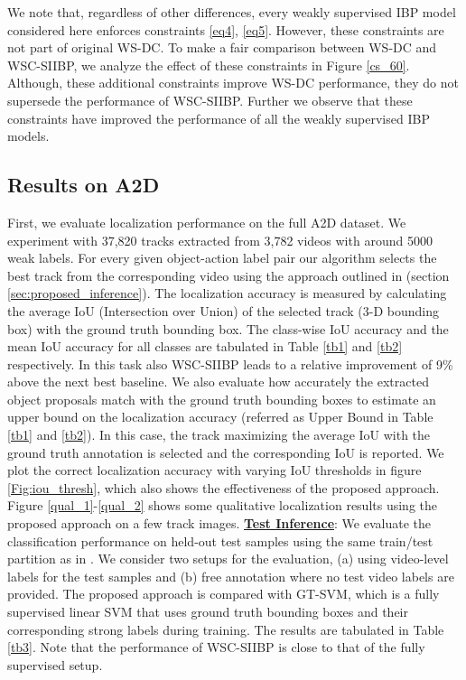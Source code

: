 \documentclass[runningheads]{llncs}
\begin{document}
 We note that, regardless of other differences, every weakly supervised IBP model considered here enforces constraints \eqref{eq4}, \eqref{eq5}. However, these constraints are not part of original WS-DC. To make a fair comparison between WS-DC and WSC-SIIBP, we analyze the effect of these constraints in Figure \ref{cs_60}. Although, these additional constraints improve WS-DC performance, they do not supersede the performance of WSC-SIIBP. Further we observe that these constraints have improved the performance of all the weakly supervised IBP models.


\subsection{Results on A2D}
First, we evaluate localization performance on the full A2D dataset. We experiment with 37,820 tracks extracted from 3,782 videos with around 5000 weak labels. For every given object-action label pair our algorithm selects the best track from the corresponding video using the approach outlined in (section \ref{sec:proposed_inference}). The localization accuracy is measured by calculating the average IoU (Intersection over Union) of the selected track (3-D bounding box) with the ground truth bounding box. The class-wise IoU accuracy and the mean IoU accuracy for all classes are tabulated in Table \ref{tb1} and \ref{tb2} respectively. In this task also WSC-SIIBP leads to a relative improvement of 9\% above the next best baseline. We also evaluate how accurately the extracted object proposals match with the ground truth bounding boxes to estimate an upper bound on the localization accuracy (referred as Upper Bound in Table \ref{tb1} and \ref{tb2}). In this case, the track maximizing the average IoU with the ground truth annotation is selected and the corresponding IoU is reported. We plot the correct localization accuracy with varying IoU thresholds in figure \ref{Fig:iou_thresh}, which also shows the effectiveness of the proposed approach. Figure \ref{qual_1}-\ref{qual_2} shows some qualitative localization results using the proposed approach on a few track images.
\newline
\noindent
\underline{\bf Test Inference}: We evaluate the classification performance on held-out test samples using the same train/test partition as in \cite{xu2015can}. We consider two setups for the evaluation, (a) using video-level labels for the test samples and (b) free annotation where no test video labels are provided. The proposed approach is compared with GT-SVM, which is a fully supervised linear SVM that uses ground truth bounding boxes and their corresponding strong labels during training. The results are tabulated in Table \ref{tb3}. Note that the performance of WSC-SIIBP is close to that of the fully supervised setup. 
\end{document}
